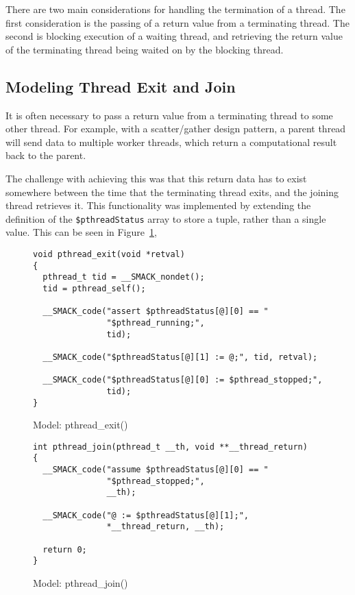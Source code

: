 There are two main considerations for handling the termination of a
thread.  The first consideration is the passing of a return value from
a terminating thread.  The second is blocking execution of a waiting
thread, and retrieving the return value of the terminating thread
being waited on by the blocking thread.

\subsection{Modeling Thread Exit and Join}
It is often necessary to pass a return value from a terminating thread
to some other thread.  For example, with a scatter/gather design
pattern, a parent thread will send data to multiple worker threads,
which return a computational result back to the parent.

The challenge with achieving this was that this return data has to
exist somewhere between the time that the terminating thread exits,
and the joining thread retrieves it.  This functionality was
implemented by extending the definition of the
\lstinline|$pthreadStatus| array to store a tuple, rather than a 
single value.  This can be seen in Figure~\ref{fig:pthread_exit}, 

\begin{figure}[h]
\centering
\caption{Model: pthread\_exit()}\label{fig:pthread_exit}
\begin{lstlisting}
void pthread_exit(void *retval)
{
  pthread_t tid = __SMACK_nondet();
  tid = pthread_self();

  __SMACK_code("assert $pthreadStatus[@][0] == "
               "$pthread_running;",
               tid);

  __SMACK_code("$pthreadStatus[@][1] := @;", tid, retval);

  __SMACK_code("$pthreadStatus[@][0] := $pthread_stopped;",
               tid);
}
\end{lstlisting}
\end{figure}

\begin{figure}[h]
\centering
\caption{Model: pthread\_join()}\label{fig:pthread_join}
\begin{lstlisting}
int pthread_join(pthread_t __th, void **__thread_return)
{
  __SMACK_code("assume $pthreadStatus[@][0] == "
               "$pthread_stopped;",
               __th);

  __SMACK_code("@ := $pthreadStatus[@][1];",
               *__thread_return, __th);

  return 0;
}

\end{lstlisting}
\end{figure}

